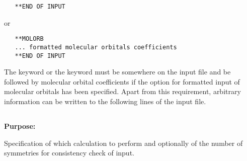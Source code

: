 \begin{inputex} \begin{verbatim}
   **END OF INPUT
\end{verbatim} \end{inputex}
or 

\begin{inputex} \begin{verbatim}
   **MOLORB
   ... formatted molecular orbitals coefficients
   **END OF INPUT
\end{verbatim} \end{inputex}
 
\noindent
The  keyword or the  keyword
must be somewhere on the input file and be
followed by molecular orbital coefficients if the option for formatted
input of molecular orbitals has been specified.  Apart from this
requirement, arbitrary information can be written to the following lines
of the input file.
 
 
 
\pagebreak[3]
\subsection{\label{ref-geninp}}
 
{\bf Purpose:}
 
Specification of which calculation to perform and
optionally of the number of symmetries for consistency check
of input.
 
